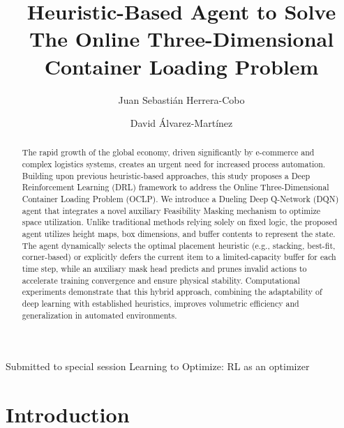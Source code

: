 \documentclass[runningheads]{llncs}
\begin{document}
\title{Heuristic-Based Agent to Solve The Online Three-Dimensional Container Loading Problem}

\author{Juan Sebasti\'an Herrera-Cobo  \and
David Álvarez-Martínez}


\maketitle

\begin{center}
Submitted to special session Learning to Optimize: RL as an optimizer
\end{center}

\begin{abstract}
The rapid growth of the global economy, driven significantly by e-commerce and complex logistics systems, creates an urgent need for increased process automation. Building upon previous heuristic-based approaches, this study proposes a Deep Reinforcement Learning (DRL) framework to address the Online Three-Dimensional Container Loading Problem (OCLP). We introduce a Dueling Deep Q-Network (DQN) agent that integrates a novel auxiliary Feasibility Masking mechanism to optimize space utilization. Unlike traditional methods relying solely on fixed logic, the proposed agent utilizes height maps, box dimensions, and buffer contents to represent the state. The agent dynamically selects the optimal placement heuristic (e.g., stacking, best-fit, corner-based) or explicitly defers the current item to a limited-capacity buffer for each time step, while an auxiliary mask head predicts and prunes invalid actions to accelerate training convergence and ensure physical stability. Computational experiments demonstrate that this hybrid approach, combining the adaptability of deep learning with established heuristics, improves volumetric efficiency and generalization in automated environments.

\end{abstract}

\section{Introduction}
\end{document}
